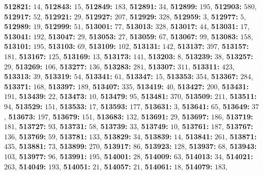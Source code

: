\textsf{\bfseries 512821:} $14$, \textsf{\bfseries 512843:} $15$, \textsf{\bfseries 512849:} $183$, \textsf{\bfseries 512891:} $34$, \textsf{\bfseries 512899:} $195$, \textsf{\bfseries 512903:} $580$, \textsf{\bfseries 512917:} $52$, \textsf{\bfseries 512921:} $29$, \textsf{\bfseries 512927:} $207$, \textsf{\bfseries 512929:} $328$, \textsf{\bfseries 512959:} $3$, \textsf{\bfseries 512977:} $5$, \textsf{\bfseries 512989:} $19$, \textsf{\bfseries 512999:} $51$, \textsf{\bfseries 513001:} $77$, \textsf{\bfseries 513013:} $328$, \textsf{\bfseries 513017:} $44$, \textsf{\bfseries 513031:} $17$, \textsf{\bfseries 513041:} $192$, \textsf{\bfseries 513047:} $29$, \textsf{\bfseries 513053:} $27$, \textsf{\bfseries 513059:} $67$, \textsf{\bfseries 513067:} $99$, \textsf{\bfseries 513083:} $158$, \textsf{\bfseries 513101:} $195$, \textsf{\bfseries 513103:} $69$, \textsf{\bfseries 513109:} $102$, \textsf{\bfseries 513131:} $142$, \textsf{\bfseries 513137:} $397$, \textsf{\bfseries 513157:} $181$, \textsf{\bfseries 513167:} $125$, \textsf{\bfseries 513169:} $13$, \textsf{\bfseries 513173:} $141$, \textsf{\bfseries 513203:} $8$, \textsf{\bfseries 513239:} $38$, \textsf{\bfseries 513257:} $29$, \textsf{\bfseries 513269:} $106$, \textsf{\bfseries 513277:} $136$, \textsf{\bfseries 513283:} $281$, \textsf{\bfseries 513307:} $311$, \textsf{\bfseries 513311:} $423$, \textsf{\bfseries 513313:} $39$, \textsf{\bfseries 513319:} $54$, \textsf{\bfseries 513341:} $61$, \textsf{\bfseries 513347:} $15$, \textsf{\bfseries 513353:} $354$, \textsf{\bfseries 513367:} $284$, \textsf{\bfseries 513371:} $168$, \textsf{\bfseries 513397:} $189$, \textsf{\bfseries 513407:} $335$, \textsf{\bfseries 513419:} $40$, \textsf{\bfseries 513427:} $200$, \textsf{\bfseries 513431:} $191$, \textsf{\bfseries 513439:} $22$, \textsf{\bfseries 513473:} $10$, \textsf{\bfseries 513479:} $95$, \textsf{\bfseries 513481:} $370$, \textsf{\bfseries 513509:} $211$, \textsf{\bfseries 513511:} $94$, \textsf{\bfseries 513529:} $151$, \textsf{\bfseries 513533:} $17$, \textsf{\bfseries 513593:} $177$, \textsf{\bfseries 513631:} $3$, \textsf{\bfseries 513641:} $65$, \textsf{\bfseries 513649:} $37$, \textsf{\bfseries 513673:} $197$, \textsf{\bfseries 513679:} $151$, \textsf{\bfseries 513683:} $132$, \textsf{\bfseries 513691:} $29$, \textsf{\bfseries 513697:} $186$, \textsf{\bfseries 513719:} $181$, \textsf{\bfseries 513727:} $93$, \textsf{\bfseries 513731:} $58$, \textsf{\bfseries 513739:} $33$, \textsf{\bfseries 513749:} $10$, \textsf{\bfseries 513761:} $187$, \textsf{\bfseries 513767:} $136$, \textsf{\bfseries 513769:} $59$, \textsf{\bfseries 513781:} $133$, \textsf{\bfseries 513829:} $34$, \textsf{\bfseries 513839:} $14$, \textsf{\bfseries 513841:} $261$, \textsf{\bfseries 513871:} $435$, \textsf{\bfseries 513881:} $73$, \textsf{\bfseries 513899:} $270$, \textsf{\bfseries 513917:} $86$, \textsf{\bfseries 513923:} $128$, \textsf{\bfseries 513937:} $68$, \textsf{\bfseries 513943:} $103$, \textsf{\bfseries 513977:} $96$, \textsf{\bfseries 513991:} $195$, \textsf{\bfseries 514001:} $28$, \textsf{\bfseries 514009:} $63$, \textsf{\bfseries 514013:} $34$, \textsf{\bfseries 514021:} $263$, \textsf{\bfseries 514049:} $193$, \textsf{\bfseries 514051:} $21$, \textsf{\bfseries 514057:} $21$, \textsf{\bfseries 514061:} $18$, \textsf{\bfseries 514079:} $183$, 
